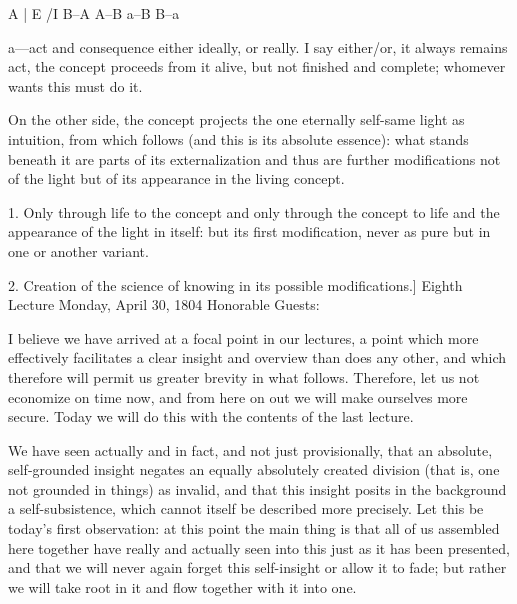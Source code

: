 A | E /I B–A A–B \R a–B B–a

a—act and consequence either ideally, or really.
I say either/or, it always remains act,
the concept proceeds from it alive,
but not finished and complete;
whomever wants this must do it.

On the other side, the concept projects
the one eternally self-same light as intuition,
from which follows (and this is its absolute essence):
what stands beneath it are parts of its externalization
and thus are further modifications not of the light
but of its appearance in the living concept.

1. Only through life to the concept
and only through the concept to life
and the appearance of the light in itself:
but its first modification, never as pure
but in one or another variant.

2. Creation of the science of knowing
in its possible modifications.]
Eighth Lecture
Monday, April 30, 1804
Honorable Guests:

I believe we have arrived at a focal point in our lectures,
a point which more effectively facilitates
a clear insight and overview than does any other,
and which therefore will permit us greater brevity in what follows.
Therefore, let us not economize on time now,
and from here on out we will make ourselves more secure.
Today we will do this with the contents of the last lecture.

We have seen actually and in fact,
and not just provisionally,
that an absolute, self-grounded insight negates
an equally absolutely created division
(that is, one not grounded in things)
as invalid, and that this insight posits
in the background a self-subsistence,
which cannot itself be described more precisely.
Let this be today’s first observation:
at this point the main thing is that
all of us assembled here together have
really and actually seen into this
just as it has been presented,
and that we will never again forget this
self-insight or allow it to fade;
but rather we will take root in it
and flow together with it into one.

